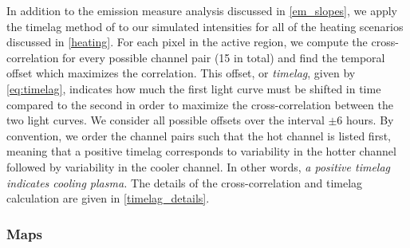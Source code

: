 In addition to the emission measure analysis discussed in \autoref{em_slopes}, we apply the timelag method of \citet{viall_evidence_2012} to our simulated intensities for all of the heating scenarios discussed in \autoref{heating}. For each pixel in the active region, we compute the cross-correlation for every possible channel pair (15 in total) and find the temporal offset which maximizes the correlation. This offset, or \textit{timelag}, given by \autoref{eq:timelag}, indicates how much the first light curve must be shifted in time compared to the second in order to maximize the cross-correlation between the two light curves. We consider all possible offsets over the interval $\pm6$ hours. By convention, we order the channel pairs such that the hot channel is listed first, meaning that a positive timelag corresponds to variability in the hotter channel followed by variability in the cooler channel. In other words, \textit{a positive timelag indicates cooling plasma.} The details of the cross-correlation and timelag calculation are given in \autoref{timelag_details}.

\subsubsection{Maps}\label{timelag_maps}

